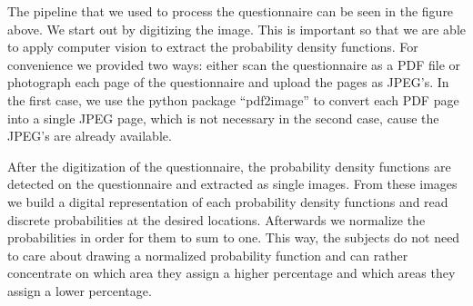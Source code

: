 \documentclass[../main/main.tex]{subfiles}
\begin{document}
\begin{center}
	\end{center}

	The pipeline that we used to process the questionnaire can be seen in the figure above. We start out by digitizing the image. This is important so that we are able to apply computer vision to extract the probability density functions. For convenience we provided two ways: either scan the questionnaire as a PDF file or photograph each page of the questionnaire and upload the pages as JPEG's. In the first case, we use the python package ``pdf2image'' to convert each PDF page into a single JPEG page, which is not necessary in the second case, cause the JPEG's are already available.  

	After the digitization of the questionnaire, the probability density functions are detected on the questionnaire and extracted as single images. From these images we build a digital representation of each probability density functions and read discrete probabilities at the desired locations. Afterwards we normalize the probabilities in order for them to sum to one. This way, the subjects do not need to care about drawing a normalized probability function and can rather concentrate on which area they assign a higher percentage and which areas they assign a lower percentage. 
	
\end{document}
